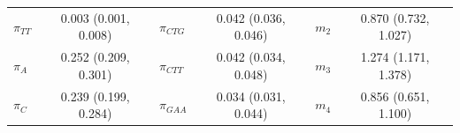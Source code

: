 \documentclass{svmult}
\begin{document}
\begin{center}
\begin{tabular}{lc lc lc}
$\pi_{TT}$     & 0.003 (0.001, 0.008) & $\pi_{CTG}$    & 0.042 (0.036, 0.046) & $m_2$          & 0.870 (0.732, 1.027) \\
$\pi_{A}$      & 0.252 (0.209, 0.301) & $\pi_{CTT}$    & 0.042 (0.034, 0.048) & $m_3$          & 1.274 (1.171, 1.378) \\
$\pi_{C}$      & 0.239 (0.199, 0.284) & $\pi_{GAA}$    & 0.034 (0.031, 0.044) & $m_4$          & 0.856 (0.651, 1.100) \\ \hline
\end{tabular}
\end{center}




\clearpage



\printindex
\end{document}
